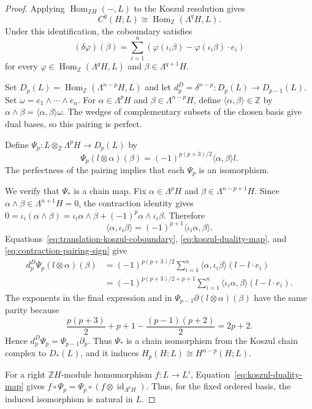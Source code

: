 \documentclass[pdflatex,sn-mathphys-num]{sn-jnl}%
\theoremstyle{plain}
\theoremstyle{remark}
\theoremstyle{definition}
\numberwithin{equation}{section}
\begin{document}
\begin{proof}
Applying \( \operatorname{Hom}_{\mathbb ZH}(-,L) \) to the Koszul resolution gives 
\[ 
C^q(H;L)
\cong
\operatorname{Hom}_{\mathbb Z}(\Lambda^qH,L). 
\]
Under this identification, the coboundary satisfies
\begin{equation}
\label{eq:translation-koszul-coboundary}
(\delta\varphi)(\beta)
=
\sum_{i=1}^n
\left(
\varphi(\iota_i\beta)
-
\varphi(\iota_i\beta)\cdot e_i
\right)
\end{equation}
for every \( \varphi\in\operatorname{Hom}_{\mathbb Z}(\Lambda^qH,L) \) and \( \beta\in\Lambda^{q+1}H \).

Set \( D_p(L)=\operatorname{Hom}_{\mathbb Z}(\Lambda^{n-p}H,L) \) and let \( d_p^D=\delta^{n-p}\colon D_p(L)\to D_{p-1}(L) \). Set \( \omega=e_1\wedge\cdots\wedge e_n \). For \( \alpha\in\Lambda^pH \) and \( \beta\in\Lambda^{n-p}H \), define \( \langle\alpha,\beta\rangle\in\mathbb Z \) by \( \alpha\wedge\beta=\langle\alpha,\beta\rangle\omega \). The wedges of complementary subsets of the chosen basis give dual bases, so this pairing is perfect.

Define \( \Psi_p\colon L\otimes_{\mathbb Z}\Lambda^pH\to D_p(L) \) by
\begin{equation}
\label{eq:koszul-duality-map}
\Psi_p(l\otimes\alpha)(\beta)
=
(-1)^{p(p+3)/2}
\langle\alpha,\beta\rangle l.
\end{equation}
The perfectness of the pairing implies that each \( \Psi_p \) is an isomorphism.

We verify that \( \Psi_* \) is a chain map. Fix \( \alpha\in\Lambda^pH \) and \( \beta\in\Lambda^{n-p+1}H \). Since \( \alpha\wedge\beta\in\Lambda^{n+1}H=0 \), the contraction identity gives \( 0 = \iota_i(\alpha\wedge\beta) = \iota_i\alpha\wedge\beta + (-1)^p\alpha\wedge\iota_i\beta \). Therefore
\begin{equation}
\label{eq:contraction-pairing-sign}
\langle\alpha,\iota_i\beta\rangle
=
(-1)^{p+1}
\langle\iota_i\alpha,\beta\rangle.
\end{equation}
Equations~\eqref{eq:translation-koszul-coboundary}, \eqref{eq:koszul-duality-map}, and \eqref{eq:contraction-pairing-sign} give
\[
\begin{aligned}
d_p^D\Psi_p(l\otimes\alpha)(\beta)
&=
(-1)^{p(p+3)/2}
\sum_{i=1}^n
\langle\alpha,\iota_i\beta\rangle
(l-l\cdot e_i)\\
&=
(-1)^{p(p+3)/2+p+1}
\sum_{i=1}^n
\langle\iota_i\alpha,\beta\rangle
(l-l\cdot e_i).
\end{aligned}
\]
The exponents in the final expression and in \( \Psi_{p-1}\partial(l\otimes\alpha)(\beta) \) have the same parity because
\[
\frac{p(p+3)}2+p+1
-
\frac{(p-1)(p+2)}2
=
2p+2.
\]
Hence \( d_p^D\Psi_p=\Psi_{p-1}\partial_p \). Thus \( \Psi_* \) is a chain isomorphism from the Koszul chain complex to \( D_*(L) \), and it induces \( H_p(H;L)\cong H^{n-p}(H;L) \).

For a right \( \mathbb ZH \)-module homomorphism \( f\colon L\to L' \), Equation~\eqref{eq:koszul-duality-map} gives \( f\circ\Psi_p=\Psi_p\circ(f\otimes\operatorname{id}_{\Lambda^pH}) \). Thus, for the fixed ordered basis, the induced isomorphism is natural in \( L \).
\end{proof}
\end{document}
